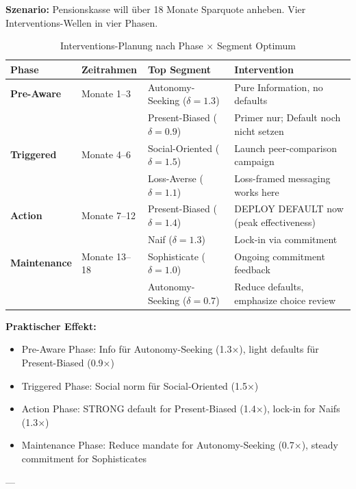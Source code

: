 \textbf{Szenario:} Pensionskasse will über 18 Monate Sparquote anheben. Vier Interventions-Wellen in vier Phasen.

\begin{table}[htbp]
\centering
\caption{Interventions-Planung nach Phase $\times$ Segment Optimum}
\label{tab:19-phase-segment-planning}
\renewcommand{\arraystretch}{1.3}
\small
\begin{tabular}{@{}llll@{}}
\toprule
\textbf{Phase} & \textbf{Zeitrahmen} & \textbf{Top Segment} & \textbf{Intervention} \\
\midrule
\textbf{Pre-Aware} & Monate 1--3 & Autonomy-Seeking ($\delta=1.3$) & Pure Information, no defaults \\
& & Present-Biased ($\delta=0.9$) & Primer nur; Default noch nicht setzen \\
\midrule
\textbf{Triggered} & Monate 4--6 & Social-Oriented ($\delta=1.5$) & Launch peer-comparison campaign \\
& & Loss-Averse ($\delta=1.1$) & Loss-framed messaging works here \\
\midrule
\textbf{Action} & Monate 7--12 & Present-Biased ($\delta=1.4$) & DEPLOY DEFAULT now (peak effectiveness) \\
& & Naif ($\delta=1.3$) & Lock-in via commitment \\
\midrule
\textbf{Maintenance} & Monate 13--18 & Sophisticate ($\delta=1.0$) & Ongoing commitment feedback \\
& & Autonomy-Seeking ($\delta=0.7$) & Reduce defaults, emphasize choice review \\
\bottomrule
\end{tabular}
\end{table}

\textbf{Praktischer Effekt:}
\begin{itemize}[nosep]
\item Pre-Aware Phase: Info für Autonomy-Seeking (1.3×), light defaults für Present-Biased (0.9×)
\item Triggered Phase: Social norm für Social-Oriented (1.5×)
\item Action Phase: STRONG default for Present-Biased (1.4×), lock-in for Naifs (1.3×)
\item Maintenance Phase: Reduce mandate for Autonomy-Seeking (0.7×), steady commitment for Sophisticates
\end{itemize}

---

